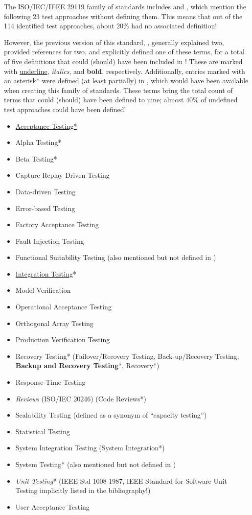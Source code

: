 The ISO/IEC/IEEE 29119 family of standards includes \citep{IEEE2022} and
\citeyearpar{IEEE2021}, which mention the following 23 test approaches without
defining them. This means that out of the 114 identified test approaches,
about 20\% had no associated definition!

However, the previous version of this standard, \citeyearpar{IEEE2013},
generally explained two, provided references for two, and explicitly defined
one of these terms, for a total of five definitions that could (should) have
been included in \citeyearpar{IEEE2022}! These are marked with
\underline{underline}, \emph{italics}, and \textbf{bold}, respectively.
Additionally, entries marked with an asterisk* were defined (at least
partially) in \citeyearpar{IEEE2017}, which would have been available when
creating this family of standards. These terms bring the total count of terms
that could (should) have been defined to nine; almost 40\% of undefined test
approaches could have been defined!

\begin{itemize}
      \item \underline{Acceptance Testing*}
      \item Alpha Testing*
      \item Beta Testing*
      \item Capture-Replay Driven Testing
      \item Data-driven Testing
      \item Error-based Testing
      \item Factory Acceptance Testing
      \item Fault Injection Testing
      \item Functional Suitability Testing (also mentioned but not defined in
            \citep{IEEE2017})
      \item \underline{Integration Testing}*
      \item Model Verification
      \item Operational Acceptance Testing
      \item Orthogonal Array Testing
      \item Production Verification Testing
      \item Recovery Testing* (Failover/Recovery Testing, Back-up/Recovery
            Testing, \textbf{Backup and Recovery Testing}*, Recovery*)
      \item Response-Time Testing
      \item \emph{Reviews} (ISO/IEC 20246) (Code Reviews*)
      \item Scalability Testing (defined as a synonym of ``capacity testing'')
      \item Statistical Testing
      \item System Integration Testing (System Integration*)
      \item System Testing* (also mentioned but not defined in \citep{IEEE2013})
      \item \emph{Unit Testing}* (IEEE Std 1008-1987, IEEE Standard for
            Software Unit Testing implicitly listed in the bibliography!)
      \item User Acceptance Testing
\end{itemize}

